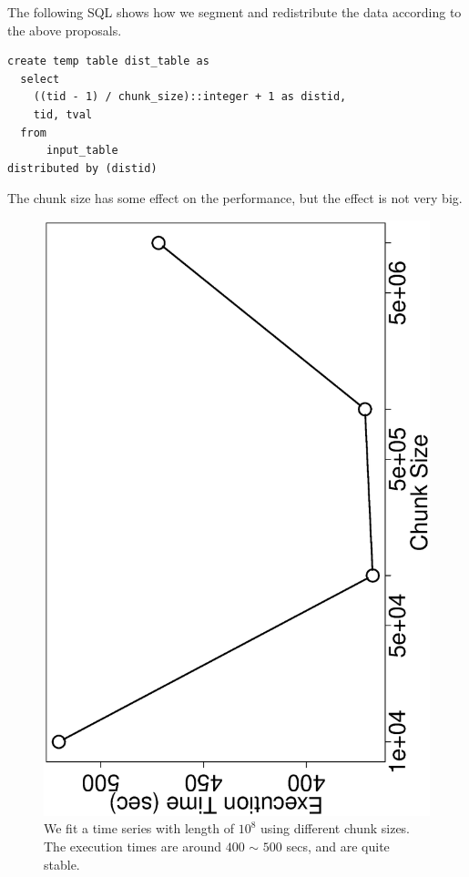 \documentclass[english,10pt]{llncs}
\begin{document}
The following SQL shows how we segment and redistribute the data according to the above proposals. 

\begin{verbatim}
create temp table dist_table as
  select
    ((tid - 1) / chunk_size)::integer + 1 as distid, 
    tid, tval
  from 
      input_table
distributed by (distid)
\end{verbatim}

The chunk size has some effect on the performance, but the effect is
not very big. 

\begin{figure}[ht]
  \begin{centering}
    \includegraphics[angle=-90,scale=0.4]{1e8_time_vs_chunksize}
  \end{centering}
  \caption{\label{fig:chunksize_effect} We fit a time series with
    length of $10^8$ using different chunk sizes. The execution times
    are around $400$ $\sim$ $500$ secs, and are quite stable. }
\end{figure}
\end{document}
